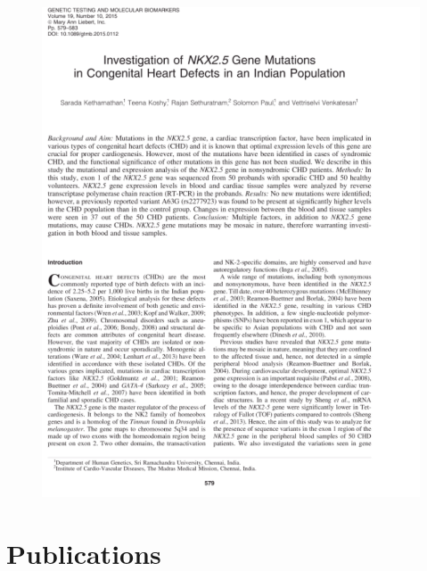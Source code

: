 \begin{figure}[!h]
\includegraphics[width=\linewidth,height=\textheight,keepaspectratio]{Appendices/Pub2.pdf}
\end{figure}

\cleardoublepage
\section*{Publications}

